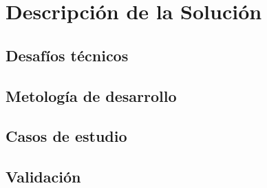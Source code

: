 \chapter{Descripci\'on de la Soluci\'on}
\label{sec-4}

\section{Desafíos t\'ecnicos}
\label{sec-4.1}

\section{Metolog\'ia de desarrollo}
\label{sec-4.2}


\section{Casos de estudio}
\label{sec-4.3}

\section{Validaci\'on}
\label{sec-4.4}